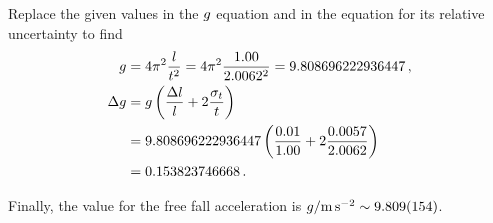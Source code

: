 Replace the given values in the $\grav$ equation and in the equation for its relative uncertainty to find
%
\begin{align*}
    \grav &= 4\pi^2\dfrac{\length}{\period^2} 
          = 4\pi^2\dfrac{1.00}{2.0062^2}
          = 9.808696222936447\,,\\
%
    \muncer\grav &= \grav\left(\dfrac{\muncer\length}{\length} + 2\dfrac{\sstdev_\period}{\period}\right)\\
                 &= 9.808696222936447\left(\dfrac{0.01}{1.00} + 2\dfrac{0.0057}{2.0062}\right)\\
                 &= 0.153823746668\,.
\end{align*}

Finally, the value for the free fall acceleration is $\grav/\si{m.s^{-2}} \sim \num{9.809 +- 0.154}$.

